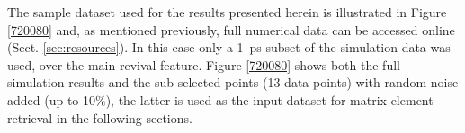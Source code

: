 The sample dataset used for the results presented herein is illustrated in Figure \ref{720080} and, as mentioned previously, full numerical data can be accessed online (Sect. \ref{sec:resources}). In this case only a 1~ps subset of the simulation data was used, over the main revival feature. Figure \ref{720080} shows both the full simulation results and the sub-selected points (13 data points) with random noise added (up to 10\%), the latter is used as the input dataset for matrix element retrieval in the following sections. %


